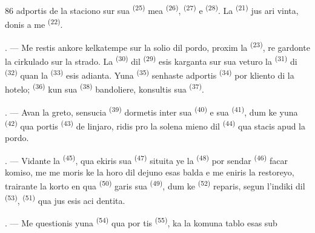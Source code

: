\begin{VUpage}[88]{86}
\VUcontinue
adportis de la staciono sur sua \cc
{} \textsuperscript{(25)} mea  \textsuperscript{(26)},  \textsuperscript{(27)} e\nl
{} \textsuperscript{(28)}. La  \textsuperscript{(21)} jus ari\cc
vinta, donis a me  \textsuperscript{(22)}.

. --- Me restis ankore kelkatempe sur la\nl
solio dil pordo, proxim la  \textsuperscript{(23)}, re\cc
gardonte la cirkulado sur la strado. La \cc
{} \textsuperscript{(30)} dil  \textsuperscript{(29)} esis karganta sur\nl
sua veturo la  \textsuperscript{(31)} di  \textsuperscript{(32)} quan\nl
la  \textsuperscript{(33)} esis adianta. Yuna \cc
{} \textsuperscript{(35)} senhaste adportis  \textsuperscript{(34)}\nl
por kliento di la hotelo;  \textsuperscript{(36)} kun sua\nl
{} \textsuperscript{(38)} bandoliere, konsultis sua\nl
{} \textsuperscript{(37)}.

\VUsaut{4.0mm}
\VUsaut{3.0mm}

. --- Avan la greto, sensucia \cc
{} \textsuperscript{(39)} dormetis inter sua  \textsuperscript{(40)} e sua\nl
{} \textsuperscript{(41)}, dum ke yuna \cc
{} \textsuperscript{(42)} qua portis  \textsuperscript{(43)} de linjaro, ridis pro\nl
la solena mieno dil  \textsuperscript{(44)} qua stacis\nl
apud la pordo.

. --- Vidante la  \textsuperscript{(45)}, qua ekiris\nl
sua  \textsuperscript{(47)} situita ye la  \textsuperscript{(48)}\nl
por sendar  \textsuperscript{(46)} facar komiso, me me\cc
moris ke la horo dil dejuno esas balda e me\nl
eniris la restoreyo, trairante la korto en qua\nl
{} \textsuperscript{(50)} garis sua  \textsuperscript{(49)}, dum ke\nl
{} \textsuperscript{(52)} reparis, segun l'indiki dil \cc
{} \textsuperscript{(53)},  \textsuperscript{(51)} qua jus esis aci\cc
dentita.

. --- Me questionis yuna  \textsuperscript{(54)} qua por\cc
tis  \textsuperscript{(55)}, ka la komuna tablo esas sub
\parplein
\end{VUpage}

